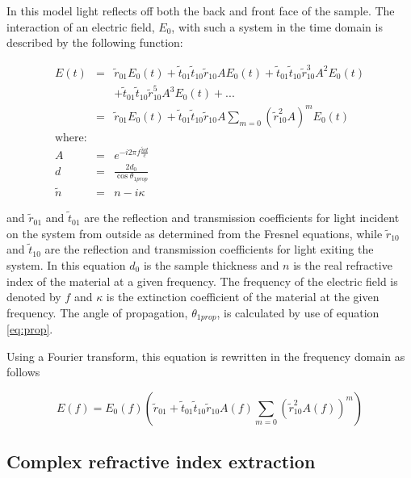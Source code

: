 In this model light reflects off both the back and front face of the sample. The interaction of an electric field, $E_{0}$,  with such a system in the time domain is described by the following function:

\begin{eqnarray}
E(t) &=& \widetilde{r}_{01}E_{0}(t) + \widetilde{t}_{01}\widetilde{t}_{10}\widetilde{r}_{10}AE_{0}(t) + \widetilde{t}_{01}\widetilde{t}_{10}\widetilde{r}^{3}_{10}A^{2}E_{0}(t)\nonumber\\ 
& & + \widetilde{t}_{01}\widetilde{t}_{10}\widetilde{r}^{5}_{10}A^{3}E_{0}(t) + ...\nonumber\\
&=& \widetilde{r}_{01}E_{0}(t) + \widetilde{t}_{01}\widetilde{t}_{10}\widetilde{r}_{10}A\sum_{m=0}(\widetilde{r}_{10}^{2}A)^{m}E_{0}(t)\\
\mbox{where:}\nonumber\\
A &=& e^{-i2\pi f \frac{\widetilde{n}d}{c}}\\
d &=& \frac{2d_{0}}{\cos{\theta_{1 prop}}}\\
\widetilde{n} &=& n - i\kappa
\label{eq:Single layer time domain Transport function}
\end{eqnarray}

and $\widetilde{r}_{01}$ and $\widetilde{t}_{01}$ are the reflection and transmission coefficients for light incident on the system from outside as determined from the Fresnel equations, while $\widetilde{r}_{10}$ and $\widetilde{t}_{10}$ are the reflection and transmission coefficients for light exiting the system. In this equation $d_{0}$ is the sample thickness and $n$ is the real refractive index of the material at a given frequency. The frequency of the electric field is denoted by $f$ and $\kappa$ is the extinction coefficient of the material at the given frequency. The angle of propagation, $\theta_{1 prop}$, is calculated by use of equation \ref{eq:prop}.

Using a Fourier transform, this equation is rewritten in the frequency domain as follows

\begin{equation}
E(f) = E_{0}(f)(\widetilde{r}_{01} + \widetilde{t}_{01}\widetilde{t}_{10}\widetilde{r}_{10}A(f)\sum_{m=0}(\widetilde{r}_{10}^{2}A(f))^{m})\label{eq:Single layer frequency domain Transport function}
\end{equation}

\subsection{Complex refractive index extraction}
\label{sub:compref}

